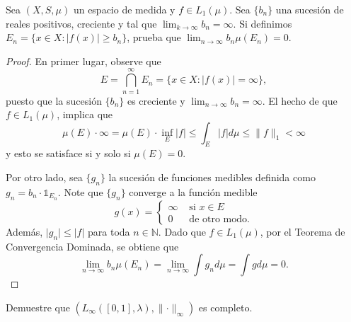 \documentclass[12pt]{article}
\newcommand{\N}{\mathbb{N}}
\newenvironment{problem}[2][Problema]{\begin{trivlist}
\item[\hskip \labelsep {\bfseries #1}\hskip \labelsep {\bfseries #2.}]}{\end{trivlist}}
\begin{document}
\begin{problem}{19} Sea $(X, S, \mu)$ un espacio de medida y $f \in L_1(\mu)$. Sea $\{b_n\}$ una sucesión de reales positivos, creciente y tal que $\lim_{k\to \infty} b_n = \infty.$ Si definimos $E_n  = \{x \in X: \lvert f(x) \rvert \geq b_n \}$, prueba que $\lim_{n\to \infty} b_n \mu(E_n) = 0.$
\end{problem}
\begin{proof} En primer lugar, observe que 
$$ E = \bigcap_{n=1}^\infty E_n = \{x \in X: \lvert f(x) \rvert = \infty \},$$
puesto que la sucesión $\{b_n\}$ es creciente y $\lim_{n\to \infty} b_n = \infty.$ El hecho de que $f \in L_1(\mu)$, implica que
$$\mu(E) \cdot \infty = \mu(E) \cdot \inf_E \lvert f \rvert \leq \int_E \lvert f \rvert d \mu  \leq \parallel f \parallel_1 < \infty$$
y esto se satisface si y solo si $\mu(E) = 0.$
%

Por otro lado, sea $\{g_n\}$ la sucesión de funciones medibles definida como $g_n = b_n\cdot \mathbb{1}_{E_n}$. Note que $\{g_n\}$ converge a la función medible
$$
g(x) = \begin{cases}
    \infty & \text{ si } x \in E\\
    0 & \text{ de otro modo.}
\end{cases}
$$
Además, $\lvert g_n \rvert  \leq  \lvert f \rvert$ para toda $n\in \N$. Dado que $f \in L_1(\mu)$, por el Teorema de Convergencia Dominada, se obtiene que 
$$ \lim_{n \to \infty} b_n \mu(E_n) = \lim_{n\to \infty} \int g_n d \mu = \int g d\mu = 0.$$
\end{proof}

\begin{problem}{20} Demuestre que $(L_\infty([0,1], \lambda), \parallel \cdot \parallel_\infty)$ es completo.
    
\end{problem}
\end{document}
